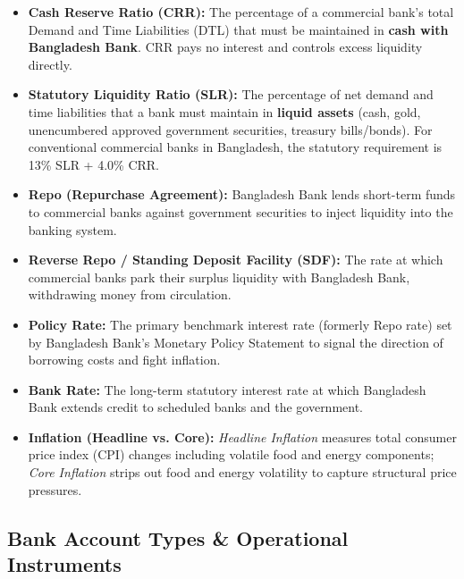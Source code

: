 \begin{itemize}
  \item \textbf{Cash Reserve Ratio (CRR):} The percentage of a commercial bank's total Demand and Time Liabilities (DTL) that must be maintained in \textbf{cash with Bangladesh Bank}. CRR pays no interest and controls excess liquidity directly.
  \item \textbf{Statutory Liquidity Ratio (SLR):} The percentage of net demand and time liabilities that a bank must maintain in \textbf{liquid assets} (cash, gold, unencumbered approved government securities, treasury bills/bonds). For conventional commercial banks in Bangladesh, the statutory requirement is 13\% SLR + 4.0\% CRR.
  \item \textbf{Repo (Repurchase Agreement):} Bangladesh Bank lends short-term funds to commercial banks against government securities to inject liquidity into the banking system.
  \item \textbf{Reverse Repo / Standing Deposit Facility (SDF):} The rate at which commercial banks park their surplus liquidity with Bangladesh Bank, withdrawing money from circulation.
  \item \textbf{Policy Rate:} The primary benchmark interest rate (formerly Repo rate) set by Bangladesh Bank's Monetary Policy Statement to signal the direction of borrowing costs and fight inflation.
  \item \textbf{Bank Rate:} The long-term statutory interest rate at which Bangladesh Bank extends credit to scheduled banks and the government.
  \item \textbf{Inflation (Headline vs. Core):} \textit{Headline Inflation} measures total consumer price index (CPI) changes including volatile food and energy components; \textit{Core Inflation} strips out food and energy volatility to capture structural price pressures.
\end{itemize}

\medskip

\subsection{Bank Account Types \& Operational Instruments}

